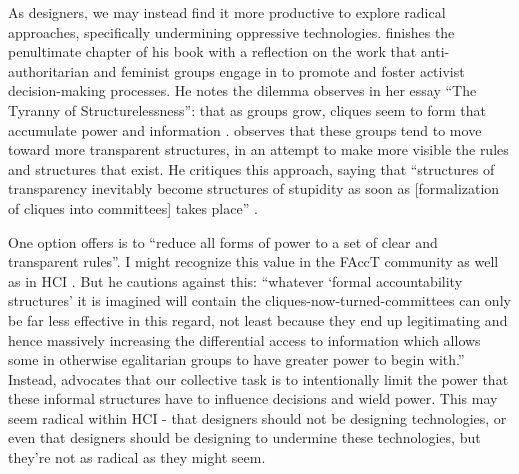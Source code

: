 \documentclass[manuscript,screen]{acmart}
\begin{document}
As designers, we may instead find it more productive to explore radical approaches, specifically undermining oppressive technologies.
\citeauthor{graeber2015utopia} finishes the penultimate chapter of his book with a reflection on the work that anti-authoritarian and feminist groups engage in to promote and foster activist decision-making processes.
He notes the dilemma \citeauthor{freeman1972tyranny} observes in her essay ``The Tyranny of Structurelessness'': that as groups grow, cliques seem to form that accumulate power and information
\cite{freeman1972tyranny}.
\citeauthor{graeber2015utopia} observes that these groups tend to move toward more transparent structures, in an attempt to make more visible the rules and structures that exist.
He critiques this approach, saying that ``structures of transparency inevitably become structures of stupidity as soon as [formalization of cliques into committees] takes place''
\cite{graeber2015utopia}.

One option \citeauthor{graeber2015utopia} offers is to ``reduce all forms of power to a set of clear and transparent rules''.
I might recognize this value in the FAccT community as well as in HCI
\cite{Amershi:2019:GHI:3290605.3300233,10.1145/3290605.3300295,Eslami:2019:UAT:3290605.3300724,Jakesch:2019:ACP:3290605.3300469,Kocielnik:2019:YAI:3290605.3300641}.
But he cautions against this: ``whatever ‘formal accountability structures' it is imagined will contain the cliques-now-turned-committees can only be far less effective in this regard, not least because they end up legitimating and hence massively increasing the differential access to information which allows some in otherwise egalitarian groups to have greater power to begin with.'' Instead, \citeauthor{graeber2015utopia} advocates that our collective task is to intentionally limit the power that these informal structures have to influence decisions and wield power.
This may seem radical within HCI - that designers should not be designing technologies, or even that designers should be designing to undermine these technologies, but they're not as radical as they might seem.
\end{document}
